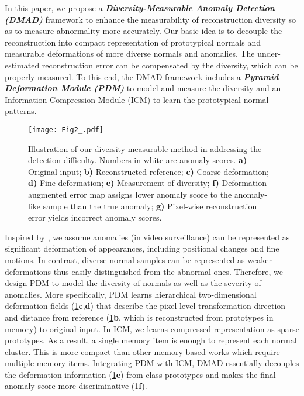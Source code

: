 \documentclass[10pt,twocolumn,letterpaper]{article}
\begin{document}
In this paper, we propose a \textit{\textbf{Diversity-Measurable Anomaly Detection (DMAD)}} framework to enhance the measurability of reconstruction diversity so as to measure abnormality more accurately. Our basic idea is to decouple the reconstruction into compact representation of prototypical normals and measurable deformations of more diverse normals and anomalies. The under-estimated reconstruction error can be compensated by the diversity, which can be properly measured. To this end, the DMAD framework includes a \textit{\textbf{Pyramid Deformation Module (PDM)}} to model and measure the diversity and an Information Compression Module (ICM) to learn the prototypical normal patterns.

\begin{figure}
  \centering
  \texttt{[image: Fig2\_.pdf]}
  \caption{Illustration of our diversity-measurable method in addressing the detection difficulty. Numbers in white are anomaly scores. \textbf{a)} Original input; \textbf{b)} Reconstructed reference; \textbf{c)} Coarse deformation; \textbf{d)} Fine deformation; \textbf{e)} Measurement of diversity\protect\footnotemark[1]; \textbf{f)} Deformation-augmented error map assigns lower anomaly score to the anomaly-like sample than the true anomaly; \textbf{g)} Pixel-wise reconstruction error yields incorrect anomaly scores.}
  \vspace{-0.1em}
  \label{fig:2}
\end{figure}

Inspired by \cite{stn,dcn}, we assume anomalies (\eg in video surveillance) can be represented as significant deformation of appearances, including positional changes and fine motions. In contrast, diverse normal samples can be represented as weaker deformations thus easily distinguished from the abnormal ones. Therefore, we design PDM to model the diversity of normals as well as the severity of anomalies. More specifically, PDM learns hierarchical two-dimensional deformation fields (\cref{fig:2}\textbf{c},\textbf{d}) that describe the pixel-level transformation direction and distance from reference (\cref{fig:2}\textbf{b}, which is reconstructed from prototypes in memory) to original input. In ICM, we learns compressed representation as sparse prototypes. As a result, a single memory item is enough to represent each normal cluster. This is more compact than other memory-based works which require multiple memory items. Integrating PDM with ICM, DMAD essentially decouples the deformation information (\cref{fig:2}\textbf{e}) from class prototypes and makes the final anomaly score more discriminative (\cref{fig:2}\textbf{f}). 
\end{document}
